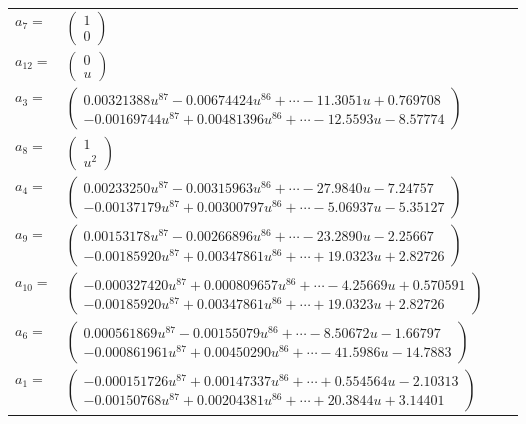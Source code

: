 \documentclass[1p]{elsarticle_modified}
\theoremstyle{definition}
\begin{document}
\begin{tabular}{m{7pt} m{180pt} m{7pt} m{180pt} }
\flushright $a_{7}=$&$\begin{pmatrix}1\\0\end{pmatrix}$ \\
\flushright $a_{12}=$&$\begin{pmatrix}0\\u\end{pmatrix}$ \\
\flushright $a_{3}=$&$\begin{pmatrix}0.00321388 u^{87}-0.00674424 u^{86}+\cdots-11.3051 u+0.769708\\-0.00169744 u^{87}+0.00481396 u^{86}+\cdots-12.5593 u-8.57774\end{pmatrix}$ \\
\flushright $a_{8}=$&$\begin{pmatrix}1\\u^2\end{pmatrix}$ \\
\flushright $a_{4}=$&$\begin{pmatrix}0.00233250 u^{87}-0.00315963 u^{86}+\cdots-27.9840 u-7.24757\\-0.00137179 u^{87}+0.00300797 u^{86}+\cdots-5.06937 u-5.35127\end{pmatrix}$ \\
\flushright $a_{9}=$&$\begin{pmatrix}0.00153178 u^{87}-0.00266896 u^{86}+\cdots-23.2890 u-2.25667\\-0.00185920 u^{87}+0.00347861 u^{86}+\cdots+19.0323 u+2.82726\end{pmatrix}$ \\
\flushright $a_{10}=$&$\begin{pmatrix}-0.000327420 u^{87}+0.000809657 u^{86}+\cdots-4.25669 u+0.570591\\-0.00185920 u^{87}+0.00347861 u^{86}+\cdots+19.0323 u+2.82726\end{pmatrix}$ \\
\flushright $a_{6}=$&$\begin{pmatrix}0.000561869 u^{87}-0.00155079 u^{86}+\cdots-8.50672 u-1.66797\\-0.000861961 u^{87}+0.00450290 u^{86}+\cdots-41.5986 u-14.7883\end{pmatrix}$ \\
\flushright $a_{1}=$&$\begin{pmatrix}-0.000151726 u^{87}+0.00147337 u^{86}+\cdots+0.554564 u-2.10313\\-0.00150768 u^{87}+0.00204381 u^{86}+\cdots+20.3844 u+3.14401\end{pmatrix}$ \\

\end{tabular}
\end{document}
